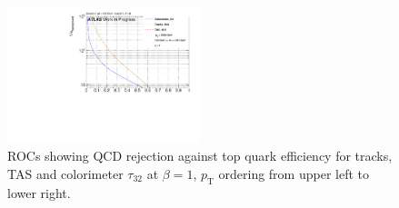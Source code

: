 \begin{figure}[htp]
\includegraphics[width=0.5\textwidth]{sascha_input/plots/Top/beta1/ROC_ALL_h_recoJet_nSub32_bin6.pdf}
\caption{\footnotesize{ROCs showing QCD rejection against top quark efficiency for tracks, TAS and colorimeter $\tau_{32}$ at $\beta=1$, $p_{\mathrm{T}}$ ordering from upper left to lower right.}}\label{fig:ROC_top}
\end{figure}



